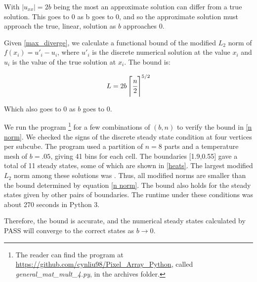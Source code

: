 \documentclass[11pt]{article}
\begin{document}
\noindent With $|u_{xx}| = 2b$ being the most an approximate solution can differ from a true solution. This goes to 0 as b goes to 0, and so the approximate solution must approach the true, linear, solution as $b$ approaches 0.

Given \cref{max_diverge}, we calculate a functional bound of the modified $L_2$ norm of $f(x_i) = u'_i-u_i$, where $u'_i$ is the discrete numerical solution at the value $x_i$ and $u_i$ is the value of the true solution at $x_i$. The bound is:

\begin{equation}
\label{n norm}
L = 2b \left \lceil \cfrac{n}{2} \right \rceil^{5/2}
\end{equation}

\noindent Which also goes to 0 as $b$ goes to 0. 

We run the program%
\footnote{The reader can find the program at \url{https://github.com/cynliu98/Pixel\_Array\_Python}, called \textit{general\_mat\_mult\_4.py}, in the archives folder.}
for a few combinations of $(b,n)$ to verify the bound in \eqref{n norm}. We checked the signs of the discrete steady state condition at four vertices per subcube. The program used a partition of $n=8$ parts and a temperature mesh of $b = .05$, giving 41 bins for each cell. The boundaries [1.9,0.55] gave a total of 11 steady states, some of which are shown in \cref{heats}. The largest modified $L_2$ norm among these solutions was . Thus, all modified norms are smaller than the bound determined by equation \cref{n norm}. The bound also holds for the steady states given by other pairs of boundaries. The runtime under these conditions was about 270 seconds in Python 3.

Therefore, the bound is accurate, and the numerical steady states calculated by PASS will converge to the correct states as $b \rightarrow 0$.

\begin{figure*}
\begin{center}
\caption{The numerical steady state approximations given for homogeneous heat equation with the boundaries [1.9,.55]}
\label{heats}
\end{center}
\end{figure*}
\end{document}
